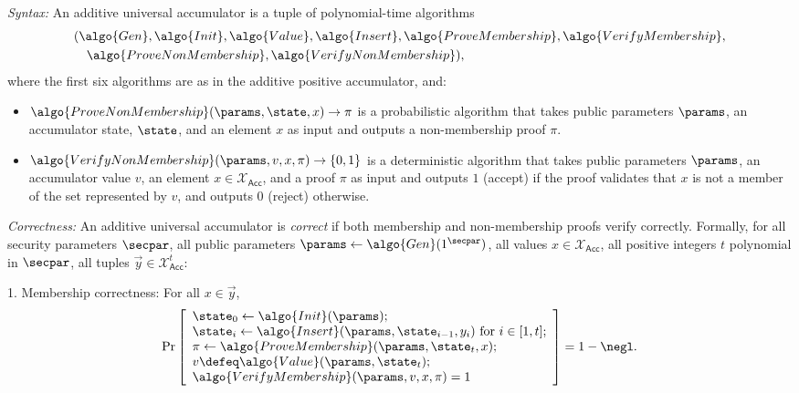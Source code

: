 \ifsolutions
\begin{mysolution}
  \emph{Syntax:} An additive universal accumulator is a tuple of polynomial-time algorithms 
  \begin{align*}
    &(\algo{Gen}, \algo{Init}, \algo{Value}, \algo{Insert}, \algo{ProveMembership}, \algo{VerifyMembership},\\
    &\quad \algo{ProveNonMembership}, \algo{VerifyNonMembership}),
  \end{align*}
  where the first six algorithms are as in the additive positive accumulator, and:
  \begin{itemize}
    \item $\algo{ProveNonMembership}(\params, \state, x) \rightarrow \pi$ is a probabilistic algorithm that takes public parameters $\params$, an accumulator state, $\state$, and an element $x$ as input and outputs a non-membership proof $\pi$.
    \item $\algo{VerifyNonMembership}(\params, v, x, \pi) \rightarrow \{0, 1\}$ is a deterministic algorithm that takes public parameters $\params$, an accumulator value $v$, an element $x \in \mathcal{X}_\mathsf{Acc}$, and a proof $\pi$ as input and outputs $1$ (accept) if the proof validates that $x$ is not a member of the set represented by $v$, and outputs $0$ (reject) otherwise.
  \end{itemize}
  
  \emph{Correctness:} An additive universal accumulator is \emph{correct} if both membership and non-membership proofs verify correctly.
  Formally, for all security parameters $\secpar$, all public parameters $\params \gets \algo{Gen}(1^\secpar)$, all values $x \in \mathcal{X}_\mathsf{Acc}$, all positive integers $t$ polynomial in $\secpar$, all tuples $\vec{y} \in \mathcal{X}_\mathsf{Acc}^{t}$:
  
  1. Membership correctness: For all $x \in \vec{y}$,
  \[
    \Pr\left[
    \begin{array}{l}
      \state_0 \gets \algo{Init}(\params); \\
      \state_i \gets \algo{Insert}(\params, \state_{i-1}, y_i) \text{ for } i \in [1, t]; \\
      \pi \gets \algo{ProveMembership}(\params, \state_t, x); \\
      v \defeq \algo{Value}(\params, \state_t); \\
      \algo{VerifyMembership}(\params, v, x, \pi) = 1
    \end{array}
    \right] = 1 - \negl.
  \]
  

\end{mysolution}
